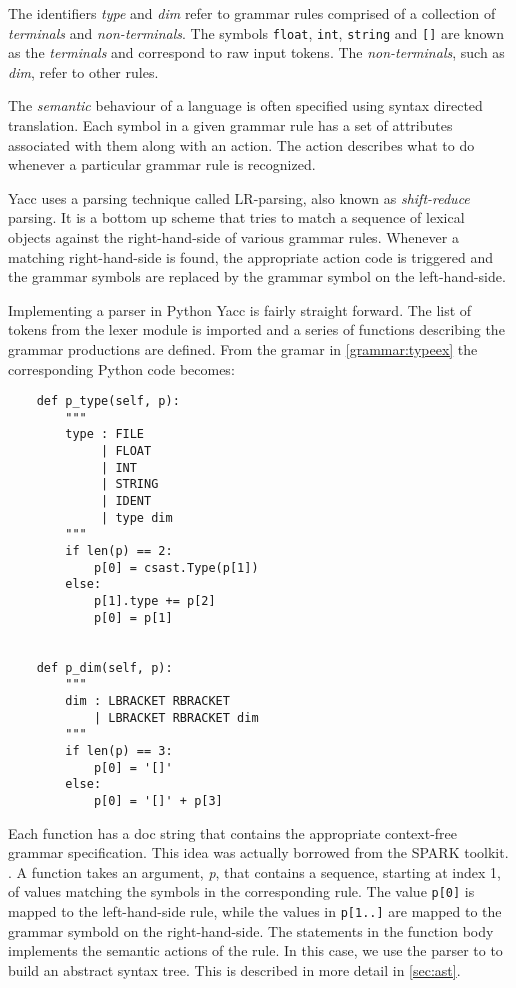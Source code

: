 \noindent The identifiers \emph{type} and \emph{dim} refer to grammar
rules comprised of a collection of \emph{terminals} and
\emph{non-terminals}. The symbols \texttt{float}, \texttt{int},
\texttt{string} and \texttt{[]} are known as the \emph{terminals}
and correspond to raw input tokens. The \emph{non-terminals}, such as
\emph{dim}, refer to other rules.

The \emph{semantic} behaviour of a language is often specified using
syntax directed translation. Each symbol in a given grammar rule has a
set of attributes associated with them along with an action. The
action describes what to do whenever a particular grammar rule is
recognized.

Yacc uses a parsing technique called LR-parsing, also known as
\emph{shift-reduce} parsing. It is a bottom up scheme that tries to
match a sequence of lexical objects against the right-hand-side of
various grammar rules. Whenever a matching right-hand-side is found,
the appropriate action code is triggered and the grammar symbols are
replaced by the grammar symbol on the left-hand-side.

Implementing a parser in Python Yacc is fairly straight forward. The
list of tokens from the lexer module is imported and a series of
functions describing the grammar productions are defined. From the
gramar in \autoref{grammar:typeex} the corresponding Python code
becomes:

\begin{lstlisting}
    def p_type(self, p):
        """
        type : FILE
             | FLOAT
             | INT
             | STRING
             | IDENT
             | type dim
        """
        if len(p) == 2:
            p[0] = csast.Type(p[1])
        else:
            p[1].type += p[2]
            p[0] = p[1]


    def p_dim(self, p):
        """
        dim : LBRACKET RBRACKET
            | LBRACKET RBRACKET dim
        """
        if len(p) == 3:
            p[0] = '[]'
        else:
            p[0] = '[]' + p[3]
\end{lstlisting}

Each function has a doc string that contains the appropriate
context-free grammar specification. This idea was actually borrowed
from the SPARK toolkit. \citep{spark:online}. A function takes an
argument, \emph{p}, that contains a sequence, starting at index 1, of
values matching the symbols in the corresponding rule. The value
\texttt{p[0]} is mapped to the left-hand-side rule, while the values
in \texttt{p[1..]} are mapped to the grammar symbold on the
right-hand-side. The statements in the function body implements the
semantic actions of the rule. In this case, we use the parser to to
build an abstract syntax tree. This is described in more detail in
\autoref{sec:ast}.


